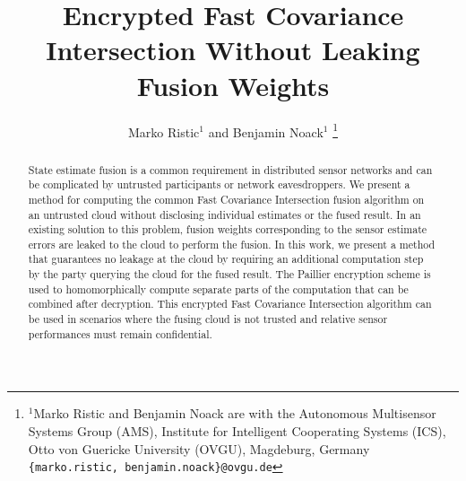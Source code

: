 \documentclass[letterpaper, 10 pt, conference]{ieeeconf}
\title{\LARGE \bf
Encrypted Fast Covariance Intersection Without Leaking Fusion Weights
}
\author{Marko Ristic$^{1}$ and Benjamin Noack$^{1}$%
\thanks{$^{1}$Marko Ristic and Benjamin Noack are with the Autonomous Multisensor Systems Group (AMS), Institute for Intelligent Cooperating Systems (ICS), Otto von Guericke University (OVGU), Magdeburg, Germany {\tt\small \{marko.ristic, benjamin.noack\}@ovgu.de}}%
}
\begin{document}
\maketitle
\thispagestyle{empty}
\pagestyle{empty}

% 
%                                    
%                                    
%                                    
% 
\begin{abstract}
    State estimate fusion is a common requirement in distributed sensor networks and can be complicated by untrusted participants or network eavesdroppers. We present a method for computing the common Fast Covariance Intersection fusion algorithm on an untrusted cloud without disclosing individual estimates or the fused result. In an existing solution to this problem, fusion weights corresponding to the sensor estimate errors are leaked to the cloud to perform the fusion. In this work, we present a method that guarantees no leakage at the cloud by requiring an additional computation step by the party querying the cloud for the fused result. The Paillier encryption scheme is used to homomorphically compute separate parts of the computation that can be combined after decryption. This encrypted Fast Covariance Intersection algorithm can be used in scenarios where the fusing cloud is not trusted and relative sensor performances must remain confidential.
\end{abstract}


% 
%                                                        
%                                                        
%                                                        
% 
\end{document}
